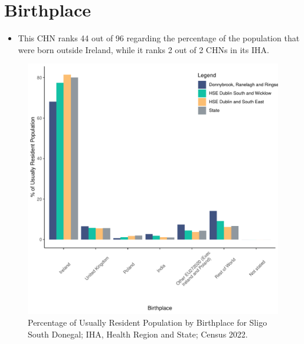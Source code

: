 \documentclass{article}
\begin{document}
\section{Birthplace}\label{sect:Birth}
\begin{itemize}
\item This CHN ranks  44 out of 96 regarding the percentage of the population that were born outside Ireland, while it ranks  2 out of 2 CHNs in its IHA.
\end{itemize}
\begin{figure}[H]
	\centering
	\includegraphics[width = 130mm]{../figures/BirthED.pdf}
	\caption{Percentage of Usually Resident Population by Birthplace for Sligo South Donegal; IHA, Health Region and State; Census 2022.}
	\label{fig:vbnv}
	\end{figure}
	
\end{document}
